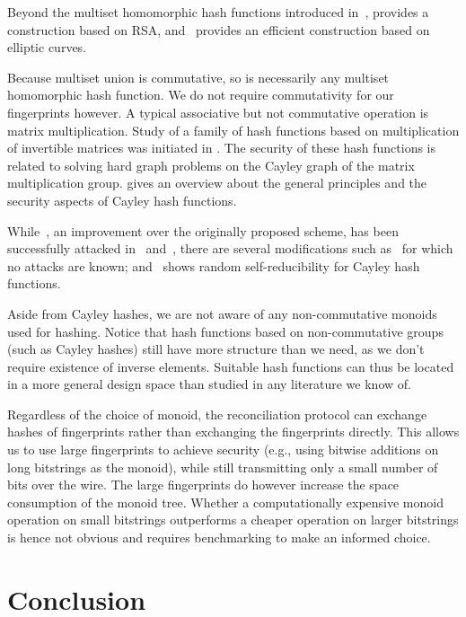 \documentclass[conference]{IEEEtran}
\begin{document}
Beyond the multiset homomorphic hash functions introduced in~\cite{bellare1997new}, \cite{cathalo2009comparing} provides a construction based on RSA, and~\cite{maitin2017elliptic} provides an efficient construction based on elliptic curves.

Because multiset union is commutative, so is necessarily any multiset homomorphic hash function. We do not require commutativity for our fingerprints however. A typical associative but not commutative operation is matrix multiplication. Study of a family of hash functions based on multiplication of invertible matrices was initiated in \cite{zemor1991hash}. The security of these hash functions is related to solving hard graph problems on the Cayley graph of the matrix multiplication group. \cite{petit2011rubik} gives an overview about the general principles and the security aspects of Cayley hash functions.

While~\cite{tillich1994hashing}, an improvement over the originally proposed scheme, has been successfully attacked in~\cite{grassl2011cryptanalysis} and~\cite{petit2010preimages}, there are several modifications such as~\cite{petit2009graph}\cite{bromberg2017navigating}\cite{sosnovski2016cayley} for which no attacks are known; and~\cite{mullan2016text} shows random self-reducibility for Cayley hash functions.

Aside from Cayley hashes, we are not aware of any non-commutative monoids used for hashing. Notice that hash functions based on non-commutative groups (such as Cayley hashes) still have more structure than we need, as we don't require existence of inverse elements. Suitable hash functions can thus be located in a more general design space than studied in any literature we know of.

Regardless of the choice of monoid, the reconciliation protocol can exchange hashes of fingerprints rather than exchanging the fingerprints directly. This allows us to use large fingerprints to achieve security (e.g., using bitwise additions on long bitstrings as the monoid), while still transmitting only a small number of bits over the wire. The large fingerprints do however increase the space consumption of the monoid tree. Whether a computationally expensive monoid operation on small bitstrings outperforms a cheaper operation on larger bitstrings is hence not obvious and requires benchmarking to make an informed choice.

\section{Conclusion}\label{conclusion}
\end{document}
